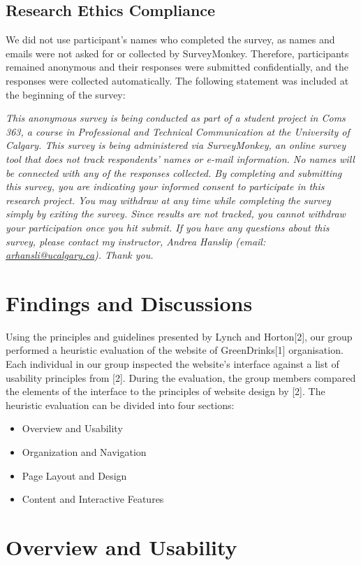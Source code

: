 \documentclass[12pt]{article}
\begin{document}
\subsection{Research Ethics Compliance}
We did not use participant’s names who completed the survey, as names and emails were not asked for or collected by SurveyMonkey. Therefore, participants remained anonymous and their responses were submitted confidentially, and the responses were collected automatically. The following statement was included at the beginning of the survey:

\emph{This anonymous survey is being conducted as part of a student project in Coms 363, a course in Professional and Technical Communication at the University of Calgary. This survey is being administered via SurveyMonkey, an online survey tool that does not track respondents’ names or e-mail information. No names will be connected with any of the responses collected. By completing and submitting this survey, you are indicating your informed consent to participate in this research project. You may withdraw at any time while completing the survey simply by exiting the survey. Since results are not tracked, you cannot withdraw your participation once you hit submit. If you have any questions about this survey, please contact my instructor, Andrea Hanslip (email: \url{arhansli@ucalgary.ca}). Thank you.}

\section{Findings and Discussions}
Using the principles and guidelines presented by Lynch and Horton[2], our group performed a heuristic evaluation of the website of GreenDrinks[1] organisation. Each individual in our group inspected the website’s interface against a list of usability principles from [2].  During the evaluation, the group members compared the elements of the interface to the principles of website design by [2]. The heuristic evaluation can be divided into four sections:
\begin{itemize}
\item Overview and Usability 
\item Organization and Navigation
\item Page Layout and Design
\item Content and Interactive Features
\end{itemize}
\section{Overview and Usability}
\end{document}
